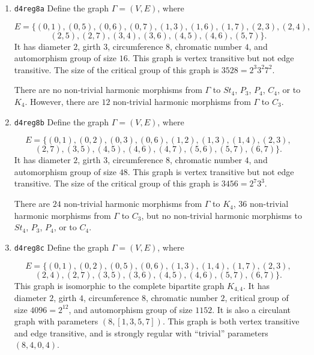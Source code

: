 \documentclass[12pt,letterpaper]{article}
\theoremstyle{definition}
\begin{document}
\begin{enumerate}
\item
{\tt d4reg8a}
\newline
Define the graph $\Gamma = (V,E)$, where


\[
E = \{
(0, 1), (0, 5), (0, 6), (0, 7), (1, 3), (1, 6), (1, 7), (2, 3), (2, 4),
\]
\[
(2, 5), (2, 7), (3, 4), (3, 6), (4, 5), (4, 6), (5, 7)
\}.
\]
It has diameter $2$,
girth $3$, circumference $8$,
chromatic number $4$, 
and automorphism group of size $16$.
This graph is vertex transitive but not edge transitive.
The size of the critical group of this graph is $3528=2^3 3^2 7^2$.

There are no non-trivial harmonic morphisms from $\Gamma$ to
$St_4$, $P_3$, $P_4$, $C_4$, or to $K_4$. However, there are $12$
non-trivial harmonic morphisms from $\Gamma$ to $C_3$.

\item
{\tt d4reg8b}
\newline  
Define the graph $\Gamma = (V,E)$, where

\[
E =
\{
(0, 1), (0, 2), (0, 3), (0, 6), (1, 2), (1, 3), (1, 4), (2, 3),
\]
\[
(2, 7), (3, 5), (4, 5), (4, 6), (4, 7), (5, 6), (5, 7), (6, 7)
\}.
\]
It has diameter $2$, girth $3$, circumference $8$,
chromatic number $4$, and automorphism group of size $48$.
This graph is vertex transitive but not edge transitive.
The size of the critical group of this graph is $3456=2^7 3^3$.

There are $24$ non-trivial harmonic morphisms from $\Gamma$ to $K_4$,
$36$ non-trivial harmonic morphisms from $\Gamma$ to $C_3$,
but no non-trivial harmonic morphisms to $St_4$, $P_3$, $P_4$, or to $C_4$.

\item
{\tt d4reg8c}
\newline  
Define the graph $\Gamma = (V,E)$, where

\[
E = \{
(0, 1), (0, 2), (0, 5), (0, 6), (1, 3), (1, 4), (1, 7), (2, 3),
\]
\[
(2, 4), (2, 7), (3, 5), (3, 6), (4, 5), (4, 6), (5, 7), (6, 7)
\}.
\]
This graph is isomorphic to the complete bipartite graph
$K_{4,4}$.
It has diameter $2$,
girth $4$, circumference $8$,
chromatic number $2$, 
critical group of size $4096 = 2^{12}$, 
and automorphism group of size $1152$.
It is also a circulant graph with parameters
$(8, [1, 3, 5, 7])$.
This graph is both vertex transitive and edge transitive,
and is strongly regular with ``trivial'' parameters $(8,4,0,4)$.


\end{enumerate}
\end{document}

